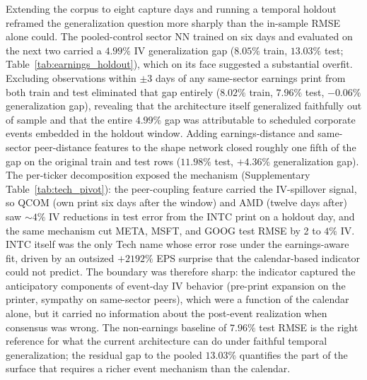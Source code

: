 Extending the corpus to eight capture days and running a temporal holdout reframed the generalization question more sharply than the in-sample RMSE alone could. The pooled-control sector NN trained on six days and evaluated on the next two carried a $4.99\%$ IV generalization gap ($8.05\%$ train, $13.03\%$ test; Table~\ref{tab:earnings_holdout}), which on its face suggested a substantial overfit. Excluding observations within $\pm 3$ days of any same-sector earnings print from both train and test eliminated that gap entirely ($8.02\%$ train, $7.96\%$ test, $-0.06\%$ generalization gap), revealing that the architecture itself generalized faithfully out of sample and that the entire $4.99\%$ gap was attributable to scheduled corporate events embedded in the holdout window. Adding earnings-distance and same-sector peer-distance features to the shape network closed roughly one fifth of the gap on the original train and test rows ($11.98\%$ test, $+4.36\%$ generalization gap). The per-ticker decomposition exposed the mechanism (Supplementary Table~\ref{tab:tech_pivot}): the peer-coupling feature carried the IV-spillover signal, so QCOM (own print six days after the window) and AMD (twelve days after) saw $\sim 4\%$ IV reductions in test error from the INTC print on a holdout day, and the same mechanism cut META, MSFT, and GOOG test RMSE by 2 to $4\%$ IV. INTC itself was the only Tech name whose error rose under the earnings-aware fit, driven by an outsized $+2192\%$ EPS surprise that the calendar-based indicator could not predict. The boundary was therefore sharp: the indicator captured the anticipatory components of event-day IV behavior (pre-print expansion on the printer, sympathy on same-sector peers), which were a function of the calendar alone, but it carried no information about the post-event realization when consensus was wrong. The non-earnings baseline of $7.96\%$ test RMSE is the right reference for what the current architecture can do under faithful temporal generalization; the residual gap to the pooled $13.03\%$ quantifies the part of the surface that requires a richer event mechanism than the calendar.

